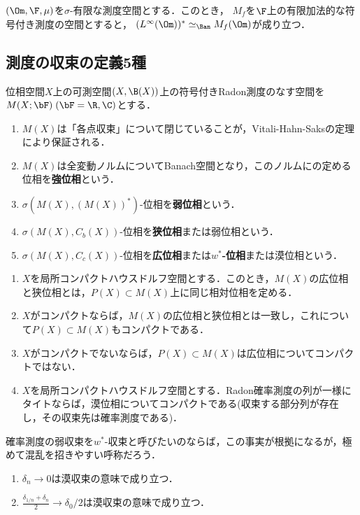 \documentclass[uplatex,dvipdfmx]{jsreport}
\begin{document}
\begin{theorem}
    $(\Om,\F,\mu)$を$\sigma$-有限な測度空間とする．このとき，
    $M_f$を$\F$上の有限加法的な符号付き測度の空間とすると，
    $(L^\infty(\Om))^*\simeq_\Ban M_f(\Om)$が成り立つ．
\end{theorem}


\subsection{測度の収束の定義5種}

\begin{definition}
    位相空間$X$上の可測空間$(X,\B(X))$上の符号付きRadon測度のなす空間を$M(X;\bF)\;(\bF=\R,\C)$とする．
    \begin{enumerate}
        \item $M(X)$は「各点収束」について閉じていることが，Vitali-Hahn-Saksの定理により保証される．
        \item $M(X)$は全変動ノルムについてBanach空間となり，このノルムにの定める位相を\textbf{強位相}という．
        \item $\sigma(M(X),(M(X))^*)$-位相を\textbf{弱位相}という．
        \item $\sigma(M(X),C_b(X))$-位相を\textbf{狭位相}または弱位相という．
        \item $\sigma(M(X),C_c(X))$-位相を\textbf{広位相}または\textbf{$w^*$-位相}または漠位相という．
    \end{enumerate}
\end{definition}

\begin{proposition}\mbox{}
    \begin{enumerate}
        \item $X$を局所コンパクトハウスドルフ空間とする．このとき，$M(X)$の広位相と狭位相とは，$P(X)\subset M(X)$上に同じ相対位相を定める．
        \item $X$がコンパクトならば，$M(X)$の広位相と狭位相とは一致し，これについて$P(X)\subset M(X)$もコンパクトである．
        \item $X$がコンパクトでないならば，$P(X)\subset M(X)$は広位相についてコンパクトではない．
        \item $X$を局所コンパクトハウスドルフ空間とする．Radon確率測度の列が一様にタイトならば，漠位相についてコンパクトである(収束する部分列が存在し，その収束先は確率測度である)．
    \end{enumerate}
\end{proposition}
\begin{remark}
    確率測度の弱収束を$w^*$-収束と呼びたいのならば，この事実が根拠になるが，極めて混乱を招きやすい呼称だろう．
\end{remark}
\begin{example}\mbox{}
    \begin{enumerate}
        \item $\delta_n\to0$は漠収束の意味で成り立つ．
        \item $\frac{\delta_{1/n}+\delta_n}{2}\to\delta_0/2$は漠収束の意味で成り立つ．
    \end{enumerate}
\end{example}
\end{document}
